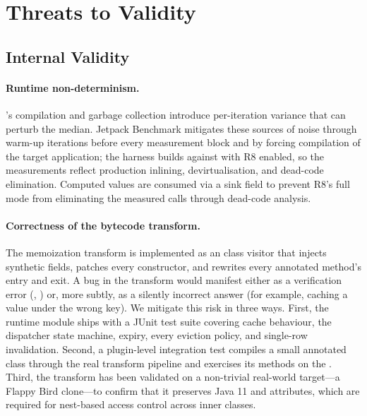 \section{Threats to Validity}\label{sec:threats}

\subsection{Internal Validity}

\paragraph{Runtime non-determinism.}
\art's \jit compilation and garbage collection introduce per-iteration variance that can perturb the median. Jetpack Benchmark mitigates these sources of noise through warm-up iterations before every measurement block and by forcing \aot compilation of the target application; the harness builds against  with R8 enabled, so the measurements reflect production inlining, devirtualisation, and dead-code elimination. Computed values are consumed via a  sink field to prevent R8's full mode from eliminating the measured calls through dead-code analysis.

\paragraph{Correctness of the bytecode transform.}
The memoization transform is implemented as an \asm class visitor that injects synthetic fields, patches every constructor, and rewrites every annotated method's entry and exit. A bug in the transform would manifest either as a verification error (, ) or, more subtly, as a silently incorrect answer (for example, caching a value under the wrong key). We mitigate this risk in three ways. First, the runtime module ships with a JUnit test suite covering cache behaviour, the dispatcher state machine, \ttl expiry, every eviction policy, and single-row invalidation. Second, a plugin-level integration test compiles a small annotated class through the real \agp transform pipeline and exercises its methods on the \jvm. Third, the transform has been validated on a non-trivial real-world target---a Flappy Bird clone---to confirm that it preserves Java 11  and  attributes, which are required for nest-based access control across inner classes.

